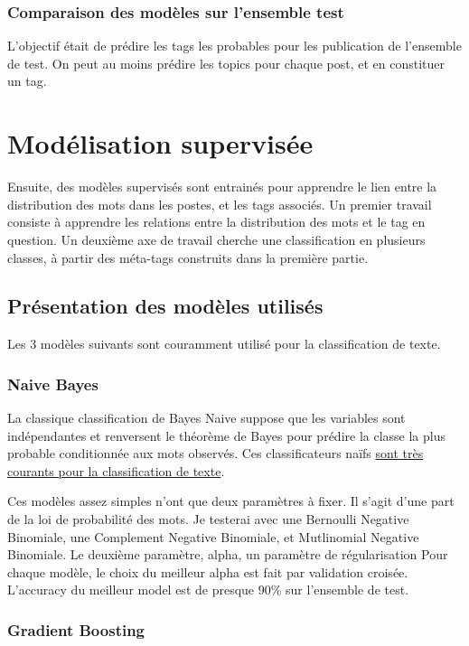 \documentclass[a4paper,11pt]{article}
\begin{document}
\subsubsection*{Comparaison des modèles sur l'ensemble test}
L'objectif était de prédire les tags les probables pour les publication de l'ensemble de test. On peut au moins prédire les topics pour chaque post, et en constituer un tag. 


\section{Modélisation supervisée}
Ensuite, des modèles supervisés sont entrainés pour apprendre le lien entre la distribution des mots dans les postes, et les tags associés. Un premier travail consiste à apprendre les relations entre la distribution des mots et le tag en question. Un deuxième axe de travail cherche une classification en plusieurs classes, à partir des méta-tags construits dans la première partie. 

\subsection{Présentation des modèles utilisés}

Les 3 modèles suivants sont couramment utilisé pour la classification de texte. 

\subsubsection*{Naive Bayes}
La classique classification de Bayes Naive suppose que les variables sont indépendantes et renversent le théorème de Bayes pour prédire la classe la plus probable conditionnée aux mots observés. Ces classificateurs naïfs {\color{blue} \href{https://mrmint.fr/naive-bayes-classifier}{sont très courants pour la classification de texte}}. 

Ces modèles assez simples n'ont que deux paramètres à fixer. Il s'agit d'une part de la loi de probabilité des mots. Je testerai avec une Bernoulli Negative Binomiale, une Complement Negative Binomiale, et Mutlinomial Negative Binomiale. Le deuxième paramètre, alpha, un paramètre de régularisation 
Pour chaque modèle, le choix du meilleur alpha est fait par validation croisée. 
L'accuracy du meilleur model est de presque $90\percent$ sur l'ensemble de test.


\subsubsection*{Gradient Boosting }
\end{document}
